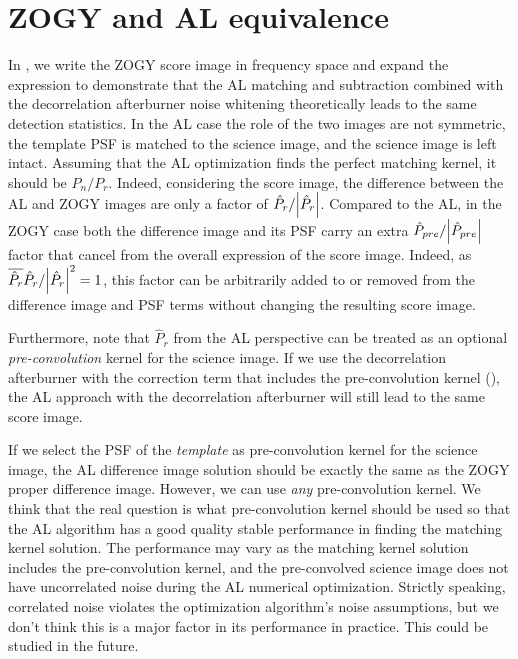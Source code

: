 \documentclass[11pt]{article}
\begin{document}
\section{ZOGY and AL equivalence\label{sec:ALZOGYequiv}}
%
\par In , we write the ZOGY score image in frequency
space and expand the expression to demonstrate that the AL matching
and subtraction combined with the decorrelation afterburner noise
whitening theoretically leads to the same detection statistics.  In the
AL case the role of the two images are not symmetric, the template PSF
is matched to the science image, and the science image is left
intact. Assuming that the AL optimization finds the perfect matching
kernel, it should be \(P_n/P_r\).  Indeed, considering the score
image, the difference between the AL and ZOGY images are only a factor
of \(\hat{P}_r/\abs{\hat{P}_r}\). Compared to the AL, in the ZOGY case
both the difference image and its PSF carry an extra
\(\hat{P}_{pre}/\abs{\hat{P}_{pre}}\) factor that cancel from the
overall expression of the score image. Indeed, as
\(\overline{\hat{P}_r}\hat{P}_r/\abs{\hat{P}_r}^2 = 1\), this factor
can be arbitrarily added to or removed from the difference image
and PSF terms without changing the resulting score image.
%
\par Furthermore, note that \(\hat{P}_r\) from the AL perspective can
be treated as an optional \emph{pre-convolution} kernel for the
science image. If we use the decorrelation afterburner with the
correction term that includes the pre-convolution kernel
(), the AL approach with the decorrelation
afterburner will still lead to the same score image.
%
\par If we select the PSF of the \emph{template} as pre-convolution
kernel for the science image, the AL difference image solution should
be exactly the same as the ZOGY proper difference image. However, we
can use \emph{any} pre-convolution kernel. We think that the real
question is what pre-convolution kernel should be used so that the AL
algorithm has a good quality stable performance in finding the
matching kernel solution. The performance may vary as the matching
kernel solution includes the pre-convolution kernel, and the
pre-convolved science image does not have uncorrelated noise during
the AL numerical optimization. Strictly speaking, correlated noise
violates the optimization algorithm’s noise assumptions, but we don't think this is a
major factor in its performance in practice. This could be studied in the future.
%
\end{document}
